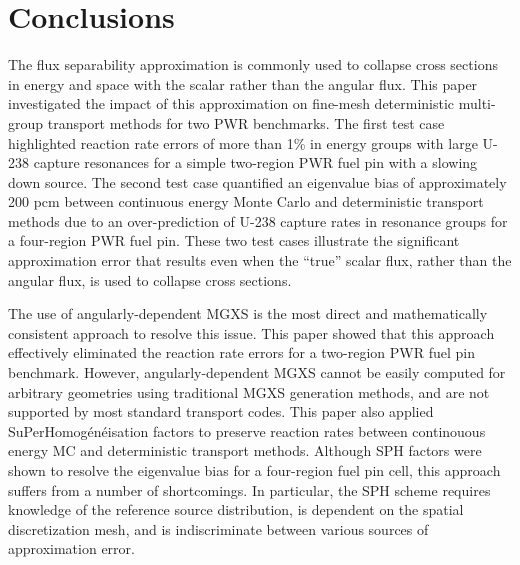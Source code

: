 \section{Conclusions}
\label{sec:conclusions}

The flux separability approximation is commonly used to collapse cross sections in energy and space with the scalar rather than the angular flux. This paper investigated the impact of this approximation on fine-mesh deterministic multi-group transport methods for two PWR benchmarks. The first test case highlighted reaction rate errors of more than 1\% in energy groups with large U-238 capture resonances for a simple two-region PWR fuel pin with a slowing down source. The second test case quantified an eigenvalue bias of approximately 200 pcm between continuous energy Monte Carlo and deterministic transport methods due to an over-prediction of U-238 capture rates in resonance groups for a four-region PWR fuel pin. These two test cases illustrate the significant approximation error that results even when the ``true'' scalar flux, rather than the angular flux, is used to collapse cross sections.


The use of angularly-dependent MGXS is the most direct and mathematically consistent approach to resolve this issue. This paper showed that this approach effectively eliminated the reaction rate errors for a two-region PWR fuel pin benchmark. However, angularly-dependent MGXS cannot be easily computed for arbitrary geometries using traditional MGXS generation methods, and are not supported by most standard transport codes. This paper also applied SuPerHomog\'{e}n\'{e}isation factors to preserve reaction rates between continouous energy MC and deterministic transport methods. Although SPH factors were shown to resolve the eigenvalue bias for a four-region fuel pin cell, this approach suffers from a number of shortcomings. In particular, the SPH scheme requires knowledge of the reference source distribution, is dependent on the spatial discretization mesh, and is indiscriminate between various sources of approximation error.

